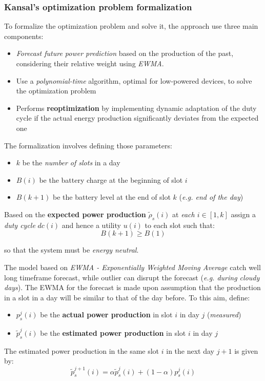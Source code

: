 \documentclass[10pt,a4paper]{report}
\theoremstyle{definition}
\begin{document}
\subsubsection{Kansal's optimization problem formalization}\label{sec:kansals-optimization-problem-formalization}
To formalize the optimization problem and solve it, the approach use three main components:
\begin{itemize}
	\item 
	\textit{Forecast future power prediction} based on the production of the past, considering their relative weight using \textit{EWMA}.
	\item 
	Use a \textit{polynomial-time} algorithm, optimal for low-powered devices, to solve the optimization problem
	\item 
	Performs \textbf{reoptimization} by implementing dynamic adaptation of the duty cycle if the actual energy production significantly deviates from the expected one
\end{itemize}

The formalization involves defining those parameters:
\begin{itemize}
	\item 
	$k$ be the \textit{number of slots} in a day
	\item 
	$B(i)$ be the battery charge at the beginning of slot $i$
	\item 
	$B(k+1)$ be the battery level at the end of slot $k$ (\textit{e.g. end of the day})

\end{itemize}
Based on the \textbf{expected power production} $\tilde{\rho}_{s}(i)$ at \textit{each  $i \in [1,k]$} assign a \textit{duty cycle}  $dc(i)$ and hence a utility $u(i)$ to each slot such that:
\begin{equation}
	B(k+1) \geq B(1)
\end{equation}

so that the system must be \textit{energy neutral}.

The model based on \textit{EWMA - Exponentially Weighted Moving Average} catch well long timeframe forecast, while outlier can disrupt the forecast (\textit{e.g. during cloudy days}). The EWMA for the forecast is made upon assumption that the production in a slot in a day will be similar to that of the day before. To this aim, define:
\begin{itemize}
	\item 
	$p_{s}^{j}(i)$ be the \textbf{actual power production} in slot $i$ in day $j$ (\textit{measured})
	\item 
	$\tilde{p}_{s}^{j}(i)$ be the \textbf{estimated power production} in slot $i$ in day $j$
	
\end{itemize}
The estimated power production in the same slot $i$ in the next day $j+1$ is given by:
\begin{equation}
	\tilde{p}_{s}^{j+1}(i) = \alpha \tilde{p}_{s}^{j}(i) + (1-\alpha)p_{s}^{j}(i)
\end{equation}
\end{document}
